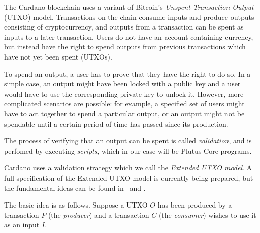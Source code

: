 \documentclass[a4paper]{article}
\begin{document}
The Cardano blockchain uses a variant of Bitcoin's \textit{Unspent
  Transaction Output} (UTXO) model.  Transactions on the chain consume
inputs and produce outputs consisting of cryptocurrency, and outputs
from a transaction can be spent as inputs to a later transaction.
Users do not have an account containing currency, but instead have the
right to spend outputs from previous transactions which have not yet
been spent (UTXOs).

To spend an output, a user has to prove that they have the right to do
so.  In a simple case, an output might have been locked with a public
key and a user would have to use the corresponding private key to
unlock it.  However, more complicated scenarios are possible: for
example, a specified set of users might have to act together to spend
a particular output, or an output might not be spendable until a
certain period of time has passed since its production.

The process of verifying that an output can be spent is called
\textit{validation}, and is perfomed by executing \textit{scripts},
which in our case will be Plutus Core programs.


Cardano uses a validation strategy which we call the \textit{Extended
  UTXO model}.  A full specification of the Extended UTXO model is
currently being prepared, but the fundamental ideas can be found
in~\cite{Zahnentferner18-Chimeric} and \cite{Zahnentferner18-UTxO}.

The basic idea is as follows.  Suppose a UTXO $O$ has been produced by a
transaction $P$ (the \textit{producer}) and a transaction $C$ (the
\textit{consumer}) wishes to use it as an input $I$.
\end{document}
